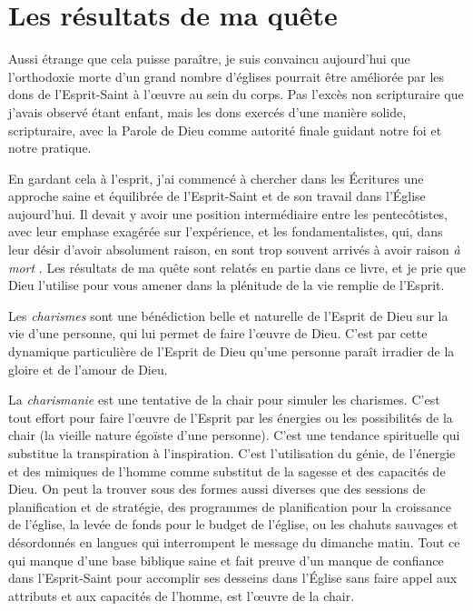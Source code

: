 \section{Les r\'esultats de ma qu\^ete}

Aussi étrange que cela puisse paraître, je suis convaincu aujour\-d'hui que
 l'orthodoxie morte d'un grand nombre d'églises pourrait être améliorée par les
 dons de l'Esprit-Saint à l'œuvre au sein du corps. Pas l'excès non scripturaire que
 j'avais observé étant enfant, mais les dons exercés d'une manière solide,
 scripturaire, avec la Parole de Dieu comme autorité finale guidant notre foi et
 notre pratique.

En gardant cela à l'esprit, j'ai commencé à chercher dans les Écritures une
 approche saine et équilibrée de l'Esprit-Saint et de son travail dans l'Église
 aujourd'hui. Il devait y avoir une position inter\-mé\-di\-aire entre les
 pentecôtistes, avec leur emphase exagérée sur l'ex\-pé\-rience, et les
 fondamentalistes, qui, dans leur désir d'avoir absolument raison,
 en sont trop souvent arrivés à avoir raison \emph{à mort}
 .
 Les résultats de ma quête sont relatés en partie dans ce livre, et je prie que
 Dieu l'utilise pour vous amener dans la plénitude de la vie remplie de
 l'Esprit.

Les \emph{charismes} sont une bénédiction belle et naturelle de l'Esprit de Dieu
 sur la vie d'une personne, qui lui permet de faire l'œuvre de Dieu. C'est par
 cette dynamique particulière de l'Esprit de Dieu qu'une personne paraît irradier de
 la gloire et de l'amour de Dieu.

La \emph{charismanie} est une tentative de la chair pour simuler les charismes.
 C'est tout effort pour faire l'œuvre de l'Esprit par les énergies ou les
 possibilités de la chair (la vieille nature égoïste d'une personne). C'est
 une tendance spirituelle qui substitue la transpiration à l'inspiration. C'est
 l'utilisation du génie, de l'énergie et des mimiques de l'homme comme substitut
 de la sagesse et des capacités de Dieu. On peut la trouver sous des formes
 aussi diverses que des sessions de planification et de stratégie, des
 programmes de planification pour la croissance de l'église, la levée de fonds
 pour le budget de l'église, ou les chahuts sauvages et désordonnés en langues
 qui interrompent le message du dimanche matin. Tout ce qui manque d'une base
 biblique saine et fait preuve d'un manque de confiance dans l'Esprit-Saint pour
 accomplir ses desseins dans l'Église sans faire appel aux attributs
 et aux capacités de l'homme, est l'œuvre de la chair.

